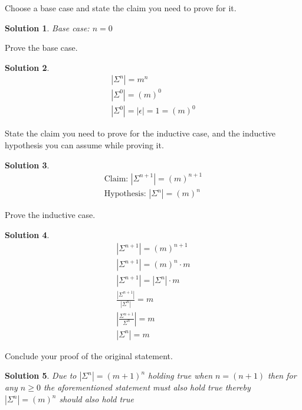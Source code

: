 \documentclass[11pt]{article}
\newtheorem*{solution}{Solution}
\begin{document}
\begin{qunlist}
\begin{qparts}
    \item
    Choose a base case and state the claim you need to prove for it.
    \begin{solution}
      Base case: $n=0$
    \end{solution}

    \item
    Prove the base case.
    \begin{solution}
      \begin{gather}
        |\Sigma^n| = m^n\\
        |\Sigma^0| = \left(m\right)^0\\
        |\Sigma^0| = |\epsilon| = 1= \left(m\right)^0
      \end{gather}
    \end{solution}

    \item
    State the claim you need to prove for the inductive case, and the inductive hypothesis you can assume while proving it.
    \begin{solution}
      \begin{align}
        \mbox{Claim: }|\Sigma^{n+1}| = \left(m\right)^{n+1} \\
        \mbox{Hypothesis: }|\Sigma^n| = \left(m\right)^n
      \end{align}

    \end{solution}

    \item
    Prove the inductive case.
    \begin{solution}
      \begin{gather}
        |\Sigma^{n+1}| = \left(m\right)^{n+1}\\
        |\Sigma^{n+1}| = \left(m\right)^n \cdot m\\
        |\Sigma^{n+1}| = |\Sigma^n| \cdot m\\
        \frac{|\Sigma^{n+1}|}{|\Sigma^n|} = m\\
        \left|\frac{\Sigma^{n+1}}{\Sigma^n}\right| = m\\
        |\Sigma^n| = m
      \end{gather}
    \end{solution}

    \item
    Conclude your proof of the original statement.
    \begin{solution}
      Due to $|\Sigma^n| = \left(m+1\right)^n$ holding true when $n =(n+1)$ then for any $n \geq 0$ the aforementioned statement must also hold true thereby $|\Sigma^n| = \left(m\right)^n$ should also hold true
    \end{solution}
  \end{qparts}


\end{qunlist}
\end{document}
